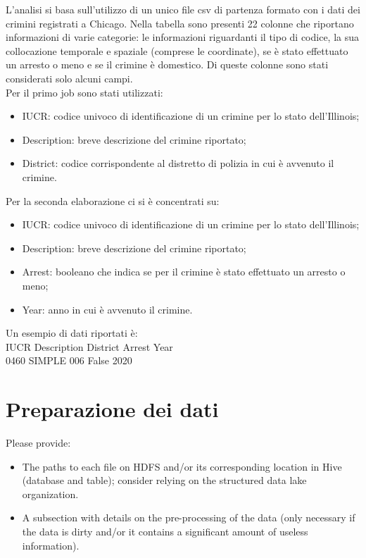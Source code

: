 \documentclass[10pt]{article}
\begin{document}
L'analisi si basa sull'utilizzo di un unico file csv di partenza formato con i dati dei crimini registrati a Chicago.
Nella tabella sono presenti 22 colonne che riportano informazioni di varie categorie: le informazioni riguardanti il tipo di codice, la sua collocazione temporale e spaziale (comprese le coordinate), se è stato effettuato un arresto o meno e se il crimine è domestico. Di queste colonne sono stati considerati solo alcuni campi.\\
 Per il primo job sono stati utilizzati:
\begin{itemize}
\item IUCR: codice univoco di identificazione di un crimine per lo stato dell'Illinois;
\item Description: breve descrizione del crimine riportato;
\item District: codice corrispondente al distretto di polizia in cui è avvenuto il crimine.
\end{itemize}
Per la seconda elaborazione ci si è concentrati su:
\begin{itemize}
\item IUCR: codice univoco di identificazione di un crimine per lo stato dell'Illinois;
\item Description: breve descrizione del crimine riportato;
\item Arrest: booleano che indica se per il crimine è stato effettuato un arresto o meno;
\item Year: anno in cui è avvenuto il crimine.
\end{itemize}

Un esempio di dati riportati è:\\
IUCR Description District Arrest Year \\
0460   SIMPLE      006    False  2020



\section{Preparazione dei dati}
Please provide:
\begin{itemize}
\item The paths to each file on HDFS and/or its corresponding location in Hive (database and table); consider relying on the structured data lake organization.
\item A subsection with details on the pre-processing of the data (only necessary if the data is dirty and/or it contains a significant amount of useless information).
\end{itemize}
\end{document}
